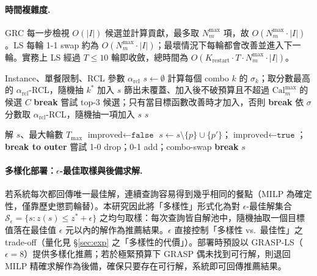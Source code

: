 \documentclass[a4paper]{article}
\begin{document}
\paragraph{時間複雜度.} GRC 每一步檢視 $O(|I|)$ 候選並計算貢獻，最多取 $N^{\max}_m$ 項，故 $O(N^{\max}_m\cdot |I|)$。LS 每輪 1-1 swap 約為 $O(N^{\max}_m\cdot |I|)$；最壞情況下每輪都會改善並進入下一輪。實務上 LS 經過 $T\le 10$ 輪即收斂，總時間為 $O(K_{\text{restart}}\cdot T\cdot N^{\max}_m\cdot |I|)$。

\begin{algorithm}[h]
\caption{Greedy Randomized Construction (GRC) sub-procedure}
\label{alg:grc}
\begin{algorithmic}[1]
\Require Instance、單餐限制、RCL 參數 $\alpha_{\text{rcl}}$
\State $s \gets \emptyset$
    \State 計算每個 combo $k$ 的 $\sigma_k$；取分數最高的 $\alpha_{\text{rcl}}$-RCL，隨機抽 $k^*$ 加入 $s$ 
\EndIf
{}
    \State 篩出未覆蓋、加入後不破預算且不超過 $\text{Cal}^{\max}_m$ 的候選 $C$
     \textbf{break} \EndIf
        \State 嘗試 top-3 候選；只有當目標函數改善時才加入，否則 \textbf{break}
    \Else
        \State 依 $\sigma$ 分數取 $\alpha_{\text{rcl}}$-RCL，隨機抽一項加入 $s$
    \EndIf
\EndWhile
\State \Return $s$
\end{algorithmic}
\end{algorithm}

\begin{algorithm}[h]
\caption{Local Search (1-1 swap / 1-0 drop / 0-1 add / combo-swap)}
\label{alg:ls}
\begin{algorithmic}[1]
\Require 解 $s$、最大輪數 $T_{\max}$
  \State $\text{improved} \gets \texttt{false}$
      \State $s \gets s\setminus\{p\}\cup\{p'\}$；$\text{improved}\gets\texttt{true}$；\textbf{break to outer}
    \EndIf
  \EndFor
   嘗試 1-0 drop；0-1 add；combo-swap \EndIf
   \textbf{break} \EndIf
\EndFor
\State \Return $s$
\end{algorithmic}
\end{algorithm}

\paragraph{多樣化部署：$\epsilon$-最佳取樣與後備求解.}\label{par:eps}
若系統每次都回傳唯一最佳解，連續查詢容易得到幾乎相同的餐點（MILP 為確定性，僅靠歷史懲罰輪替）。本研究因此將「多樣性」形式化為對 $\epsilon$-最佳解集合 $\mathcal{S}_\epsilon=\{s : z(s)\le z^*+\epsilon\}$ 之均勻取樣：每次查詢皆自解池中，隨機抽取一個目標值落在最佳值 $\epsilon$ 元以內的解作為推薦結果。$\epsilon$ 直接控制「多樣性 vs.\ 最佳性」之 trade-off（量化見 \S\ref{sec:exp} 之「多樣性的代價」）。部署時預設以 GRASP-LS（$\epsilon=8$）提供多樣化推薦；若於極緊預算下 GRASP 偶未找到可行解，則退回 MILP 精確求解作為後備，確保只要存在可行解，系統即可回傳推薦結果。
\end{document}
